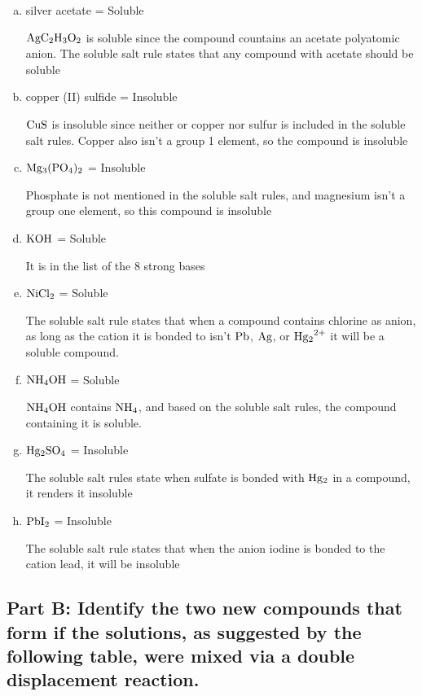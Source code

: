 \documentclass{scrartcl}
\begin{document}
\begin{enumerate}[a.]
\item silver acetate = Soluble

\(\ce{AgC2H3O2}\) is soluble since the compound
countains an acetate  polyatomic anion. The soluble salt rule states that any
compound with acetate should be soluble

\item copper (II) sulfide = Insoluble

\(\ce{CuS}\) is insoluble since neither or
copper nor sulfur is included in the soluble salt rules. Copper also isn't a
group 1 element, so the compound is insoluble

\item \(\ce{Mg3(PO4)2}\) = Insoluble

Phosphate is not mentioned in the soluble
salt rules, and magnesium isn't a group one element, so this compound is
insoluble

\item \(\ce{KOH}\) = Soluble

It is in the list of the 8 strong bases

\item \(\ce{NiCl2}\) = Soluble

The soluble salt rule states that when a compound
contains chlorine as anion, as long as the cation it is bonded to isn't
\(\ce{Pb}\),     \(\ce{Ag}\), or \(\ce{Hg2^{2+}}\) it will be a soluble
compound.

\item \(\ce{NH4OH}\) = Soluble

\(\ce{NH4OH}\) contains \(\ce{NH4}\), and based on
the soluble salt rules, the compound containing it is soluble.

\item \(\ce{Hg2SO4}\) = Insoluble

The soluble salt rules state when sulfate is
bonded with     \(\ce{Hg2}\) in a compound, it renders it insoluble

\item \(\ce{PbI2}\) = Insoluble

The soluble salt rule states that when the anion
iodine is bonded to the cation lead, it will be insoluble
\end{enumerate}

\subsection{Part B: Identify the two new compounds that form if the solutions, as suggested by the following table, were mixed via a double displacement reaction.}
\label{sec:org85694bb}
\end{document}
